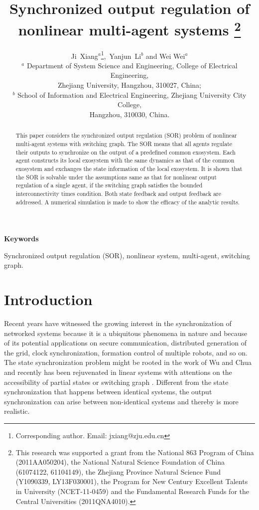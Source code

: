 \documentclass[onecolumn,a4paper,12pt]{article}
\title{Synchronized output regulation of nonlinear multi-agent systems
\thanks{This research was supported a grant from the National 863 Program of China (2011AA050204), the National Natural Science Foundation of China (61074122, 61104149), the Zhejiang Province Natural Science Fund (Y1090339,  LY13F030001), the Program for New Century Excellent Talents in University (NCET-11-0459) and the Fundamental Research Funds for the Central Universities (2011QNA4010).}%
}
\author{Ji~Xiang$^a$\thanks{Corresponding author. Email: jxiang@zju.edu.cn},~Yanjun~Li$^b$ and Wei Wei$^a$\\
\small $^a$ Department of System Science and Engineering, College of Electrical Engineering, \\[-0.5em]
\small      Zhejiang University, Hangzhou, 310027, China;\\
\small $^b$ School of Information and Electrical Engineering, Zhejiang University City College,\\[-0.5em]
\small      Hangzhou, 310030, China.
%
}
\date{}
\newenvironment{keywords}{\begin{center}{\bf Keywords}\end{center}\vspace{0em}}{}
\numberwithin{equation}{section}
\begin{document}
 \maketitle
\begin{abstract}
This paper considers the synchronized output regulation (SOR) problem of nonlinear
multi-agent systems with switching graph. The SOR means that all agents regulate their
outputs to synchronize on the output of a predefined common exosystem. Each agent
constructs its local exosystem with the same dynamics as that of the common exosystem
and exchanges the state information of the local exosystem. It is shown that the SOR is
solvable under the assumptions same as that for nonlinear output regulation of a single
agent, if the switching graph satisfies the bounded interconnectivity times condition.
Both state feedback and output feedback are addressed. A numerical simulation is made
to show the efficacy of the analytic results.
\end{abstract}

\begin{center}
\begin{keywords}
Synchronized output regulation (SOR), nonlinear system, multi-agent, switching graph.
\end{keywords}
\end{center}

\section{Introduction}
Recent years have witnessed the growing interest in the synchronization of networked systems because it is a ubiquitous phenomena in nature and because of its potential applications on secure communication, distributed generation of the grid, clock synchronization, formation control of multiple robots, and so on. The state synchronization problem might be rooted in the work of Wu and Chua \cite{WuTCASI1995} and recently has been rejuvenated in linear systems with attentions on the accessibility of partial states or switching graph
\cite{ScardoviAU2009} \cite{SeoAU2009} \cite{LiTCASI2010} \cite{DzhunusovARC2011}. Different from the state synchronization that happens between identical systems, the output synchronization can arise between non-identical systems and thereby is more realistic.
\end{document}
